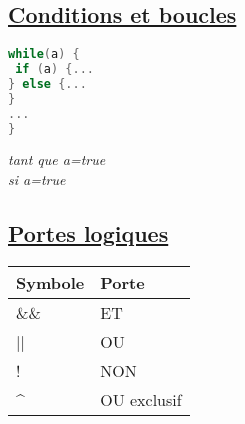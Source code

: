 \documentclass[a3paper,12pt]{article}
\begin{document}
\begin{minipage}[t]{0.49\textwidth}
\begin{tcolorbox}[title=Booléens, fonttitle=\large, top=5pt, bottom=5pt, boxsep=1pt, colback=white,
  colframe=black, 
  colbacktitle=black,
  coltitle=white,]
\subsection*{{\small \underline{Conditions et boucles}}}
\vspace{-1.25em}
\noindent
\begin{minipage}[t]{0.5\textwidth} 
\begin{lstlisting}[language=C, basicstyle=\normalsize, aboveskip=0pt, belowskip=0pt,showstringspaces=false]
while(a) {
 if (a) {...
} else {...
}
...
}
\end{lstlisting}
\end{minipage}%
\hfill
\begin{minipage}[t]{0.45\textwidth}
\vspace{0.15em}
\textit{tant que a=true}\\
\textit{si a=true}
\end{minipage}
\vspace{-0.5em}
\subsection*{{\small \underline{Portes logiques}}}
\begin{tabular}{|l|p{4cm}|}
\hline
\textbf{Symbole} & \textbf{Porte}\\
\hline
\&\& & ET\\
\hline
|| & OU\\
\hline
! & NON\\
\hline
\^{} & OU exclusif\\
\hline

\end{tabular}
  \end{tcolorbox}
  
  \end{minipage}
\end{document}
